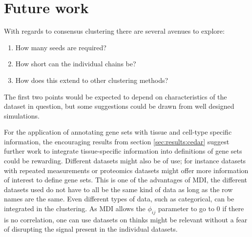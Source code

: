 \documentclass[12pt]{article} %
\begin{document}
	\section{Future work}
	With regards to consensus clustering there are several avenues to explore:
	\begin{enumerate}
		\item How many seeds are required?
		\item How short can the individual chains be?
		\item How does this extend to other clustering methods?
	\end{enumerate}
	The first two points would be expected to depend on characteristics of the dataset in question, but some suggestions could be drawn from well designed simulations.
	
	For the application of annotating gene sets with tissue and cell-type specific information, the encouraging results from section \ref{sec:results:cedar} suggest further work to integrate tissue-specific information into definitions of gene sets could be rewarding. Different datasets might also be of use; for instance datasets with repeated measurements or proteomics datasets might offer more information of interest to define gene sets. This is one of the advantages of MDI, the different datasets used do not have to all be the same kind of data as long as the row names are the same. Even different types of data, such as categorical, can be integrated in the clustering. As MDI allows the $\phi_{ij}$ parameter to go to 0 if there is no correlation, one can use datasets on thinks might be relevant without a fear of disrupting the signal present in the individual datasets.
	
	
	
\end{document}
